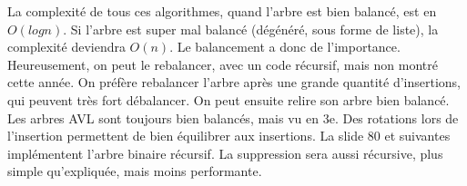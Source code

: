 \documentclass[10pt]{article}
\begin{document}
\newline \newline 
La complexité de tous ces algorithmes, quand l'arbre est bien balancé, est en $O(log n)$. Si l'arbre est super mal balancé (dégénéré, sous forme de liste), la complexité deviendra $O(n)$. Le balancement a donc de l'importance. Heureusement, on peut le rebalancer, avec un code récursif, mais non montré cette année. On préfère rebalancer l'arbre après une grande quantité d'insertions, qui peuvent très fort débalancer. On peut ensuite relire son arbre bien balancé.  
\newline \newline 
Les arbres AVL sont toujours bien balancés, mais vu en 3e. Des rotations lors de l'insertion permettent de bien équilibrer aux insertions. La slide 80 et suivantes implémentent l'arbre binaire récursif. La suppression sera aussi récursive, plus simple qu'expliquée, mais moins performante.
\newpage
\end{document}
